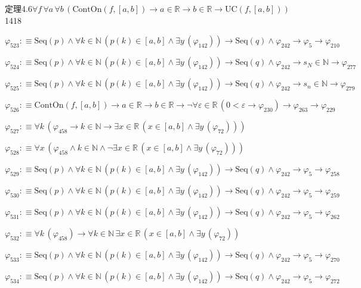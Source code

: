 \begin{fullproof}{定理4.6}{$\forall f\,\forall a\,\forall b\,(\mathrm{ContOn}(f,[a,b]) \to a \in \mathbb{R} \to b \in \mathbb{R} \to \mathrm{UC}(f,[a,b]))$}{1418}
\begin{abbrevlist}
\item $\varphi_{523} :\equiv \mathrm{Seq}(p) \land \forall k \in \mathbb{N}\,(p(k) \in [a,b] \land \exists y\,(\varphi_{142})) \to \mathrm{Seq}(q) \land \varphi_{242} \to \varphi_{5} \to \varphi_{210}$
\item $\varphi_{524} :\equiv \mathrm{Seq}(p) \land \forall k \in \mathbb{N}\,(p(k) \in [a,b] \land \exists y\,(\varphi_{142})) \to \mathrm{Seq}(q) \land \varphi_{242} \to s_{N} \in \mathbb{N} \to \varphi_{277}$
\item $\varphi_{525} :\equiv \mathrm{Seq}(p) \land \forall k \in \mathbb{N}\,(p(k) \in [a,b] \land \exists y\,(\varphi_{142})) \to \mathrm{Seq}(q) \land \varphi_{242} \to s_{n} \in \mathbb{N} \to \varphi_{279}$
\item $\varphi_{526} :\equiv \mathrm{ContOn}(f,[a,b]) \to a \in \mathbb{R} \to b \in \mathbb{R} \to \neg \forall \varepsilon \in \mathbb{R}\,(0 < \varepsilon \to \varphi_{230}) \to \varphi_{263} \to \varphi_{229}$
\item $\varphi_{527} :\equiv \forall k\,(\varphi_{458} \to k \in \mathbb{N} \to \exists x \in \mathbb{R}\,(x \in [a,b] \land \exists y\,(\varphi_{72})))$
\item $\varphi_{528} :\equiv \forall x\,(\varphi_{458} \land k \in \mathbb{N} \land \neg \exists x \in \mathbb{R}\,(x \in [a,b] \land \exists y\,(\varphi_{72})))$
\item $\varphi_{529} :\equiv \mathrm{Seq}(p) \land \forall k \in \mathbb{N}\,(p(k) \in [a,b] \land \exists y\,(\varphi_{142})) \to \mathrm{Seq}(q) \land \varphi_{242} \to \varphi_{5} \to \varphi_{258}$
\item $\varphi_{530} :\equiv \mathrm{Seq}(p) \land \forall k \in \mathbb{N}\,(p(k) \in [a,b] \land \exists y\,(\varphi_{142})) \to \mathrm{Seq}(q) \land \varphi_{242} \to \varphi_{5} \to \varphi_{259}$
\item $\varphi_{531} :\equiv \mathrm{Seq}(p) \land \forall k \in \mathbb{N}\,(p(k) \in [a,b] \land \exists y\,(\varphi_{142})) \to \mathrm{Seq}(q) \land \varphi_{242} \to \varphi_{5} \to \varphi_{262}$
\item $\varphi_{532} :\equiv \forall k\,(\varphi_{458}) \to \forall k \in \mathbb{N}\,\exists x \in \mathbb{R}\,(x \in [a,b] \land \exists y\,(\varphi_{72}))$
\item $\varphi_{533} :\equiv \mathrm{Seq}(p) \land \forall k \in \mathbb{N}\,(p(k) \in [a,b] \land \exists y\,(\varphi_{142})) \to \mathrm{Seq}(q) \land \varphi_{242} \to \varphi_{5} \to \varphi_{270}$
\item $\varphi_{534} :\equiv \mathrm{Seq}(p) \land \forall k \in \mathbb{N}\,(p(k) \in [a,b] \land \exists y\,(\varphi_{142})) \to \mathrm{Seq}(q) \land \varphi_{242} \to \varphi_{5} \to \varphi_{272}$

\end{abbrevlist}
\end{fullproof}
